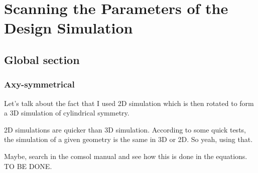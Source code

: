
\chapter{Scanning the Parameters of the Design Simulation} %

\label{ChapterElectrodesScan} %


\section{Global section}

\subsection{Axy-symmetrical} 

Let's talk about the fact that I used 2D simulation which is then rotated to form a 3D simulation of cylindrical symmetry.

2D simulations are quicker than 3D simulation.
According to some quick tests, the simulation of a given geometry is the same in 3D or 2D.
So yeah, using that.

Maybe, search in the comsol manual and see how this is done in the equations.
TO BE DONE.

